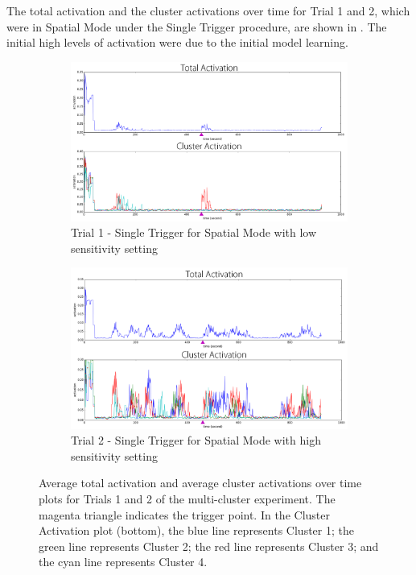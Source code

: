 The total activation and the cluster activations over time for Trial 1 and 2, which were in Spatial Mode under the Single Trigger procedure, are shown in . 
The initial high levels of activation were due to the initial model learning. 

\begin{figure}[!htb]
	\centering
	\begin{subfigure}[t]{0.8\textwidth}
		\centering
		\includegraphics[width=1.0 \textwidth]{"fig/validations/multicluster trial 1"}
		\caption{Trial 1 - Single Trigger for Spatial Mode with low sensitivity setting}
		\label{fig:multicluster trial 1}
	\end{subfigure}
	
	\begin{subfigure}[t]{0.8\textwidth}
		\centering
		\includegraphics[width=1.0 \textwidth]{"fig/validations/multicluster trial 2"}
		\caption{Trial 2 - Single Trigger for Spatial Mode with high sensitivity setting}
		\label{fig:multicluster trial 2}
	\end{subfigure}
	\caption[Average total activation and average cluster activations plots for Trials 1 and 2 of the multi-cluster experiment]{Average total activation and average cluster activations over time plots for Trials 1 and 2 of the multi-cluster experiment. The magenta triangle indicates the trigger point. In the Cluster Activation plot (bottom), the blue line represents Cluster 1; the green line represents Cluster 2; the red line represents Cluster 3; and the cyan line represents Cluster 4.}
	\label{fig:multicluster 1-2}
\end{figure}

